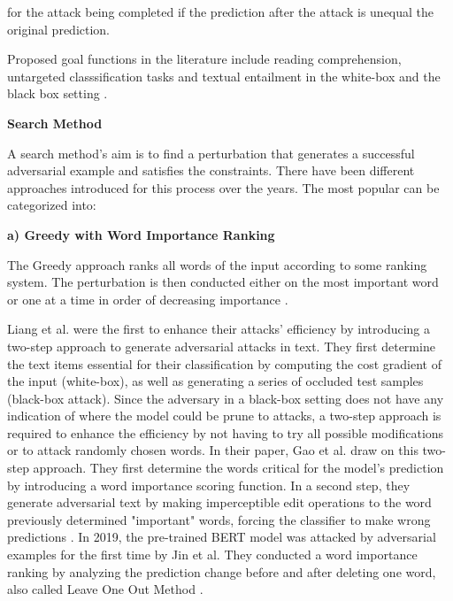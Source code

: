 for the attack being completed if the prediction after the attack is unequal the original prediction. 

Proposed goal functions in the literature include reading comprehension, untargeted classsification tasks \cite{ebrahimi2017hotflip, alzantot2018generating, li2018textbugger, jin2019bert, garg2020bae} and textual entailment \cite{jin2019bert, alzantot2018generating} in the white-box \cite{papernot2016crafting, liang2017deep, ebrahimi2017hotflip, jin2019bert} and the black box setting \cite{gao2018black, goodman2020fastwordbug}.

\textbf{Search Method}
\label{sec:search_method}

A search method's aim is to find a perturbation that generates a successful adversarial example and satisfies the constraints. There have been different approaches introduced for this process over the years. The most popular can be categorized into:

    \textbf{a) Greedy with Word Importance Ranking}
    
        The Greedy approach ranks all words of the input according to some ranking system. The perturbation is then conducted either on the most important word or one at a time in order of decreasing importance \cite{li2018textbugger, jin2019bert, garg2020bae}.
    
        Liang et al. were the first to enhance their attacks' efficiency by introducing a two-step approach to generate adversarial attacks in text. They first determine the text items essential for their classification by computing the cost gradient of the input (white-box), as well as generating a series of occluded test samples (black-box attack)\cite{liang2017deep}. 
        Since the adversary in a black-box setting does not have any indication of where the model could be prune to attacks, a two-step approach is required to enhance the efficiency by not having to try all possible modifications or to attack randomly chosen words. 
        In their paper, Gao et al. draw on this two-step approach. They first determine the words critical for the model's prediction by introducing a word importance scoring function. In a second step, they generate adversarial text by making imperceptible edit operations to the word previously determined "important" words, forcing the classifier to make wrong predictions \cite{gao2018black}.
        In 2019, the pre-trained BERT model was attacked by adversarial examples for the first time by Jin et al. They conducted a word importance ranking by analyzing the prediction change before and after deleting one word, also called Leave One Out Method \cite{jin2019bert}.  
        
